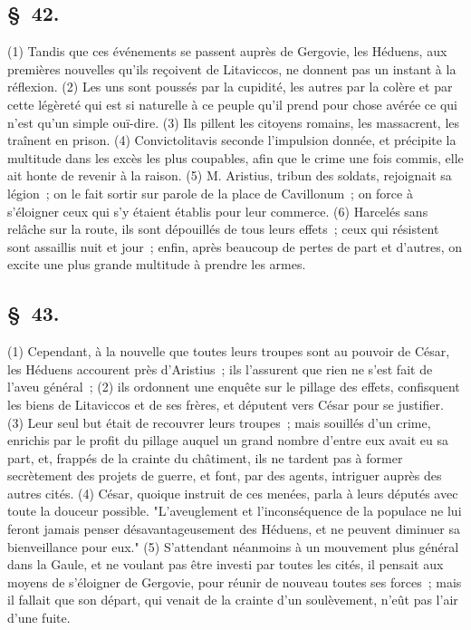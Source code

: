 \documentclass[french,twoside]{book} %
\begin{document}
\subsection[{§ 42.}]{ \textsc{§ 42.} }
\noindent (1) Tandis que ces événements se passent auprès de Gergovie, les Héduens, aux premières nouvelles qu’ils reçoivent de Litaviccos, ne donnent pas un instant à la réflexion. (2) Les uns sont poussés par la cupidité, les autres par la colère et par cette légèreté qui est si naturelle à ce peuple qu’il prend pour chose avérée ce qui n’est qu’un simple ouï-dire. (3) Ils pillent les citoyens romains, les massacrent, les traînent en prison. (4) Convictolitavis seconde l’impulsion donnée, et précipite la multitude dans les excès les plus coupables, afin que le crime une fois commis, elle ait honte de revenir à la raison. (5) M. Aristius, tribun des soldats, rejoignait sa légion ; on le fait sortir sur parole de la place de Cavillonum ; on force à s’éloigner ceux qui s’y étaient établis pour leur commerce. (6) Harcelés sans relâche sur la route, ils sont dépouillés de tous leurs effets ; ceux qui résistent sont assaillis nuit et jour ; enfin, après beaucoup de pertes de part et d’autres, on excite une plus grande multitude à prendre les armes.
\subsection[{§ 43.}]{ \textsc{§ 43.} }
\noindent (1) Cependant, à la nouvelle que toutes leurs troupes sont au pouvoir de César, les Héduens accourent près d’Aristius ; ils l’assurent que rien ne s’est fait de l’aveu général ; (2) ils ordonnent une enquête sur le pillage des effets, confisquent les biens de Litaviccos et de ses frères, et députent vers César pour se justifier. (3) Leur seul but était de recouvrer leurs troupes ; mais souillés d’un crime, enrichis par le profit du pillage auquel un grand nombre d’entre eux avait eu sa part, et, frappés de la crainte du châtiment, ils ne tardent pas à former secrètement des projets de guerre, et font, par des agents, intriguer auprès des autres cités. (4) César, quoique instruit de ces menées, parla à leurs députés avec toute la douceur possible. "L'aveuglement et l’inconséquence de la populace ne lui feront jamais penser désavantageusement des Héduens, et ne peuvent diminuer sa bienveillance pour eux." (5) S'attendant néanmoins à un mouvement plus général dans la Gaule, et ne voulant pas être investi par toutes les cités, il pensait aux moyens de s’éloigner de Gergovie, pour réunir de nouveau toutes ses forces ; mais il fallait que son départ, qui venait de la crainte d’un soulèvement, n’eût pas l’air d’une fuite.
\end{document}
